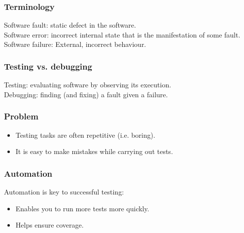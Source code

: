 \documentclass{beamer}
\newenvironment{changemargin}[1]{%
  \begin{list}{}{%
    \setlength{\topsep}{0pt}%
    \setlength{\leftmargin}{#1}%
    \setlength{\rightmargin}{1em}
    \setlength{\listparindent}{\parindent}%
    \setlength{\itemindent}{\parindent}%
    \setlength{\parsep}{\parskip}%
  }%
  \item[]}{\end{list}}
\begin{document}
\begin{frame}

\frametitle{Terminology}

  \begin{changemargin}{2em}
\alert{Software fault}: static defect in the software.\\[1em]

\alert{Software error}: incorrect internal state that is the manifestation
of some fault.\\[1em]

\alert{Software failure}: External, incorrect behaviour.
  \end{changemargin}

\end{frame}

\begin{frame}

\frametitle{Testing vs. debugging}

  \begin{changemargin}{2em}

\alert{Testing}: evaluating software by observing its execution.\\[1em]

\alert{Debugging}: finding (and fixing) a fault given a failure.
  \end{changemargin}

\end{frame}

\begin{frame}
\frametitle{Problem}

  \begin{changemargin}{2em}

\begin{itemize}
\item Testing tasks are often repetitive (i.e. boring).
\item It is easy to make mistakes while carrying out tests.
\end{itemize}
  \end{changemargin}
\end{frame}

\begin{frame}
\frametitle{Automation}

  \begin{changemargin}{2em}

\alert{Automation} is key to successful testing:

\begin{itemize}
\item Enables you to run more tests more quickly.
\item Helps ensure coverage.
\end{itemize}
  \end{changemargin}
\end{frame}
\end{document}
